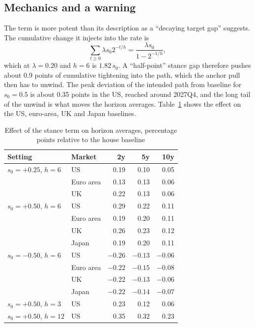 \documentclass[11pt,a4paper]{article}
\begin{document}
\subsection{Mechanics and a warning}

The term is more potent than its description as a ``decaying target gap'' suggests. The cumulative change it injects into the rate is
\begin{equation}
\sum_{t\ge0}\lambda s_0 2^{-t/h} = \frac{\lambda s_0}{1-2^{-1/h}},
\end{equation}
which at $\lambda=0.20$ and $h=6$ is $1.82\,s_0$. A ``half-point'' stance gap therefore pushes about 0.9 points of cumulative tightening into the path, which the anchor pull then has to unwind. The peak deviation of the intended path from baseline for $s_0=0.5$ is about 0.35 points in the US, reached around 2027Q4, and the long tail of the unwind is what moves the horizon averages. Table~\ref{tab:stance} shows the effect on the US, euro-area, UK and Japan baselines.

\begin{table}[htbp]
\centering\small
\caption{Effect of the stance term on horizon averages, percentage points relative to the house baseline}
\label{tab:stance}
\begin{tabular}{@{}llrrr@{}}
\toprule
Setting & Market & 2y & 5y & 10y \\
\midrule
$s_0=+0.25$, $h=6$ & US & 0.19 & 0.10 & 0.05 \\
 & Euro area & 0.13 & 0.13 & 0.06 \\
 & UK & 0.22 & 0.13 & 0.06 \\
$s_0=+0.50$, $h=6$ & US & 0.29 & 0.22 & 0.11 \\
 & Euro area & 0.19 & 0.20 & 0.11 \\
 & UK & 0.26 & 0.23 & 0.12 \\
 & Japan & 0.19 & 0.20 & 0.11 \\
$s_0=-0.50$, $h=6$ & US & $-0.26$ & $-0.13$ & $-0.06$ \\
 & Euro area & $-0.22$ & $-0.15$ & $-0.08$ \\
 & UK & $-0.22$ & $-0.13$ & $-0.06$ \\
 & Japan & $-0.22$ & $-0.14$ & $-0.07$ \\
$s_0=+0.50$, $h=3$ & US & 0.23 & 0.12 & 0.06 \\
$s_0=+0.50$, $h=12$ & US & 0.35 & 0.32 & 0.23 \\
\bottomrule
\end{tabular}
\end{table}
\end{document}
